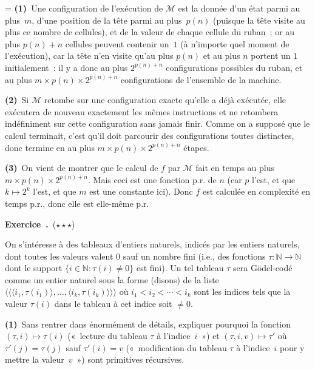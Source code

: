 \documentclass[12pt,a4paper]{article}
\theoremstyle{definition}
\newcommand\exercice{%
\refstepcounter{comcnt}\bigskip\noindent\textbf{Exercice~\thecomcnt.}}
\newcommand{\dbllangle}{\mathopen{\langle\!\langle}}
\newcommand{\dblrangle}{\mathclose{\rangle\!\rangle}}
\newif\ifcorrige
\newenvironment{corrige}%
{\ifcorrige\relax\else\setbox0=\vbox\bgroup\fi%
\smallbreak\footnotesize\noindent{\underbar{\textit{Corrigé.}}\quad}}
{{\hbox{}\nobreak\hfill\checkmark}%
\ifcorrige\relax\else\egroup\fi\par}
\begin{document}
\begin{corrige}
\textbf{(1)} Une configuration de l'exécution de $\mathscr{M}$ est la
donnée d'un état parmi au plus $m$, d'une position de la tête parmi au
plus $p(n)$ (puisque la tête visite au plus ce nombre de cellules), et
de la valeur de chaque cellule du ruban ; or au plus $p(n)+n$ cellules
peuvent contenir un $1$ (à n'importe quel moment de l'exécution), car
la tête n'en visite qu'au plus $p(n)$ et au plus $n$ portent un $1$
initialement : il y a donc au plus $2^{p(n)+n}$ configurations
possibles du ruban, et au plus $m\times p(n)\times 2^{p(n)+n}$
configurations de l'ensemble de la machine.

\textbf{(2)} Si $\mathscr{M}$ retombe sur une configuration exacte
qu'elle a déjà exécutée, elle exécutera de nouveau exactement les
mêmes instructions et ne retombera indéfiniment sur cette
configuration sans jamais finir.  Comme on a supposé que le calcul
terminait, c'est qu'il doit parcourir des configurations toutes
distinctes, donc termine en au plus $m\times p(n)\times 2^{p(n)+n}$
étapes.

\textbf{(3)} On vient de montrer que le calcul de $f$ par
$\mathscr{M}$ fait en temps au plus $m\times p(n)\times 2^{p(n)+n}$.
Mais ceci est une fonction p.r. de $n$ (car $p$ l'est, et que $k
\mapsto 2^k$ l'est, et que $m$ est une constante ici).  Donc $f$ est
calculée en complexité en temps p.r., donc elle est elle-même p.r.
\end{corrige}

%

\exercice\label{exercise-arrays-for-p-r-functions}\ (${\star}{\star}{\star}$)\par\nobreak

On s'intéresse à des tableaux d'entiers naturels, indicés par les
entiers naturels, dont toutes les valeurs valent $0$ sauf un nombre
fini (i.e., des fonctions $\tau \colon \mathbb{N} \to \mathbb{N}$ dont
le support $\{i \in \mathbb{N} : \tau(i) \neq 0\}$ est fini).  Un tel
tableau $\tau$ sera Gödel-codé comme un entier naturel sous la forme
(disons) de la liste $\dbllangle \langle i_1,\tau(i_1)\rangle, \ldots,
\langle i_k,\tau(i_k)\rangle \dblrangle$ où $i_1 < i_2 < \cdots < i_k$
sont les indices tels que la valeur $\tau(i)$ dans le tableau à cet
indice soit $\neq 0$.

\textbf{(1)} Sans rentrer dans énormément de détails, expliquer
pourquoi la fonction $(\tau,i) \mapsto \tau(i)$ (« lecture du tableau
$\tau$ à l'indice $i$ ») et $(\tau,i,v) \mapsto \tau'$ où $\tau'(j) =
\tau(j)$ sauf $\tau'(i) = v$ (« modification du tableau $\tau$ à
l'indice $i$ pour y mettre la valeur $v$ ») sont primitives
récursives.
\end{document}
